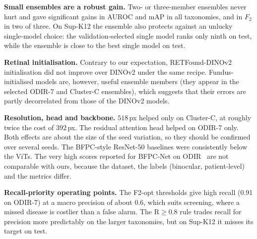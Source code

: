 ﻿\documentclass[conference]{IEEEtran}
\begin{document}
\textbf{Small ensembles are a robust gain.}
Two- or three-member ensembles never hurt and gave significant gains in AUROC and mAP in all taxonomies, and in $F_2$ in two of three.
On Sup-K12 the ensemble also protects against an unlucky single-model choice: the validation-selected single model ranks only ninth on test, while the ensemble is close to the best single model on test.

\textbf{Retinal initialisation.}
Contrary to our expectation, RETFound-DINOv2 initialisation did not improve over DINOv2 under the same recipe. Fundus-initialised models are, however, useful ensemble members (they appear in the selected ODIR-7 and Cluster-C ensembles), which suggests that their errors are partly decorrelated from those of the DINOv2 models.

\textbf{Resolution, head and backbone.}
$518$\,px helped only on Cluster-C, at roughly twice the cost of $392$\,px. The residual attention head helped on ODIR-7 only. Both effects are about the size of the seed variation, so they should be confirmed over several seeds.
The BFPC-style ResNet-50 baselines were consistently below the ViTs. The very high scores reported for BFPC-Net on ODIR~\cite{li2022bfpc} are not comparable with ours, because the dataset, the labels (binocular, patient-level) and the metrics differ.

\textbf{Recall-priority operating points.}
The F2-opt thresholds give high recall (0.91 on ODIR-7) at a macro precision of about 0.6, which suits screening, where a missed disease is costlier than a false alarm. The R$\geq$0.8 rule trades recall for precision more predictably on the larger taxonomies, but on Sup-K12 it misses its target on test.
\end{document}
